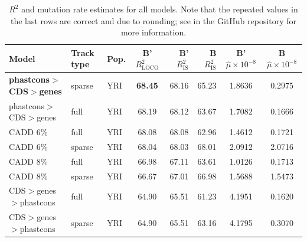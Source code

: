 \documentclass[11pt]{article}
\begin{document}
\begin{table}
    \label{supp:tbl-r2}
\centering
\caption{$R^2$ and mutation rate estimates for all models. Note that the repeated values in the last 
rows are correct and due to rounding; see  in the GitHub repository for 
more information.}
\begin{tabular}{lll|crr|cc}
    \textbf{Model} & \textbf{Track type} & \textbf{Pop.} & \textbf{B' $R_\text{LOCO}^2$} & \textbf{B' $R_\text{IS}^2$} & \textbf{B $R_\text{IS}^2$} & \textbf{B' $\hat{\mu} \times 10^{-8}$} & \textbf{B $\hat{\mu} \times 10^{-8}$} \\[0.5ex] 
\hline
\hline
    \textbf{phastcons$>$CDS$>$genes} &            sparse &          YRI &                        \textbf{68.45} &             68.16 &            65.23 &                                 1.8636 &                                0.2975 \\
phastcons$>$CDS$>$genes &              full &          YRI &                        68.19 &             68.12 &            63.67 &                                 1.7082 &                                0.1666 \\
               CADD 6\% &              full &          YRI &                        68.08 &             68.08 &            62.96 &                                 1.4612 &                                0.1721 \\
               CADD 6\% &            sparse &          YRI &                        68.04 &             68.03 &            68.01 &                                 2.0912 &                                2.0716 \\
               CADD 8\% &              full &          YRI &                        66.98 &             67.11 &            63.61 &                                 1.0126 &                                0.1713 \\
               CADD 8\% &            sparse &          YRI &                        66.67 &             67.01 &            66.98 &                                 1.5688 &                                1.5473 \\
CDS$>$genes$>$phastcons &              full &          YRI &                        64.90 &             65.51 &            61.23 &                                 4.1951 &                                0.1620 \\
CDS$>$genes$>$phastcons &            sparse &          YRI &                        64.90 &             65.51 &            63.16 &                                 4.1795 &                                0.3070 \\

\end{tabular}
\end{table}
\end{document}
